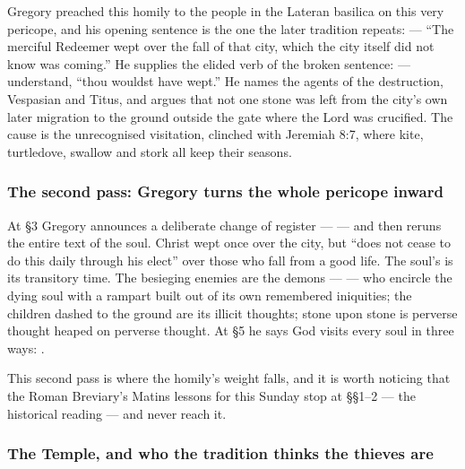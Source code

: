 \begin{witnessnote}
Gregory preached this homily to the people in the Lateran basilica on this
very pericope, and his opening sentence is the one the later tradition
repeats:  --- ``The merciful Redeemer
wept over the fall of that city, which the city itself did not know was
coming.'' He supplies the elided verb of the broken sentence:  --- understand, ``thou wouldst have
wept.'' He names the agents of the destruction, Vespasian and Titus, and
argues that not one stone was left from the city's own later migration to the
ground outside the gate where the Lord was crucified. The cause is the
unrecognised visitation, clinched with Jeremiah 8:7, where kite, turtledove,
swallow and stork all keep their seasons.
\end{witnessnote}

\subsubsection*{The second pass: Gregory turns the whole pericope inward}

At §3 Gregory announces a deliberate change of register ---  --- and then
reruns the entire text of the soul. Christ wept once over the city, but
``does not cease to do this daily through his elect'' over those who fall from
a good life. The soul's  is its transitory time. The
besieging enemies are the demons ---  --- who encircle the dying soul with
a rampart built out of its own remembered iniquities; the children dashed to
the ground are its illicit thoughts; stone upon stone is perverse thought
heaped on perverse thought. At §5 he says God visits every soul in three
ways: .

This second pass is where the homily's weight falls, and it is worth noticing
that the Roman Breviary's Matins lessons for this Sunday stop at §§1--2 ---
the historical reading --- and never reach it.

\subsubsection*{The Temple, and who the tradition thinks the thieves are}

